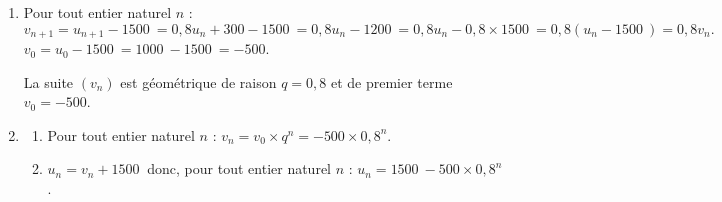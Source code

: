 \documentclass[10pt]{article}
\providecommand{\np}[2][]{{#2~#1}}
\begin{document}
\begin{enumerate}
	\item Pour tout entier naturel $n$ :
	\[v_{n+1} = u_{n+1} - \np{1500} = 0,8u_n + 300 - \np{1500} = 0,8u_n - \np{1200}
	= 0,8u_n - 0,8 \times \np{1500} = 0,8\left(u_n - \np{1500}\right) = 0,8v_n.\]
	$v_0 = u_0 - \np{1500} = \np{1000} - \np{1500} = -500$.

La suite $(v_n)$ est géométrique de raison $q = 0,8$ et de premier terme $v_0 = -500$.
	\item
	\begin{enumerate}
		\item Pour tout entier naturel $n$ : $v_n = v_0 \times q^n = -500 \times 0,8^n$.

		\item $u_n = v_n + \np{1500}$ donc, pour tout entier naturel $n$ : $u_n = \np{1500} - 500 \times 0,8^n$.
	\end{enumerate}
\end{enumerate}
\end{document}
